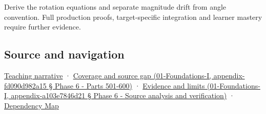 Derive the rotation equations and separate magnitude drift from angle convention. Full production proofs, target-specific integration and learner mastery require further evidence.

\subsection{Source and navigation}\label{source-and-navigation}

\href{Continuous\%20Notes/Computing\%20Foundations\%20-\%20From\%20Bits\%20to\%20C++\%20and\%20Systems\%20APIs\#Rotation\%20first\%20becomes\%20understandable\%20in\%20a\%20plane}{Teaching narrative} · \href{}{Coverage and source gap (01-Foundations-I, appendix-fd090d982a15 § Phase 6 - Parts 501-600)} · \href{}{Evidence and limits (01-Foundations-I, appendix-a103e7846d21 § Phase 6 - Source analysis and verification)} · \hyperref[appendix-4ad47bdd269a]{Dependency Map}
